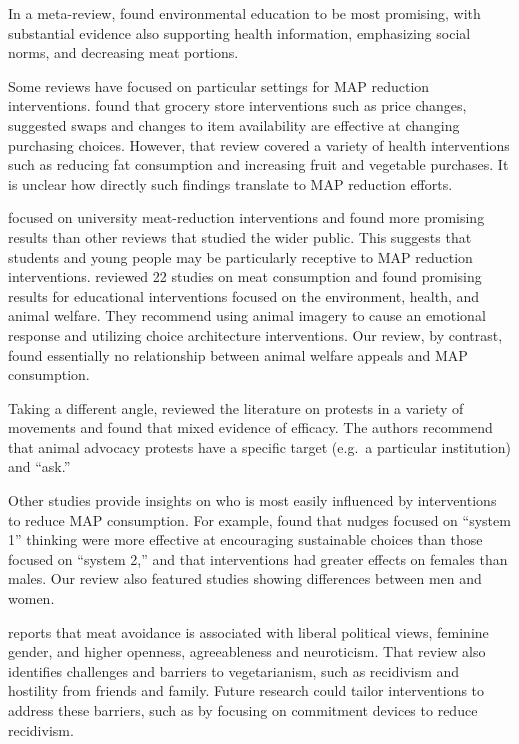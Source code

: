 \documentclass[sn-nature,referee,pdflatex]{sn-jnl}
\begin{document}
In a meta-review, \citep{grundy2022} found environmental education to be
most promising, with substantial evidence also supporting health
information, emphasizing social norms, and decreasing meat portions.

Some reviews have focused on particular settings for MAP reduction
interventions. \citep{hartmannboyce2018} found that grocery store
interventions such as price changes, suggested swaps and changes to item
availability are effective at changing purchasing choices. However, that
review covered a variety of health interventions such as reducing fat
consumption and increasing fruit and vegetable purchases. It is unclear
how directly such findings translate to MAP reduction efforts.

\citep{chang2023} focused on university meat-reduction interventions and
found more promising results than other reviews that studied the wider
public. This suggests that students and young people may be particularly
receptive to MAP reduction interventions. \citep{harguess2020} reviewed
22 studies on meat consumption and found promising results for
educational interventions focused on the environment, health, and animal
welfare. They recommend using animal imagery to cause an emotional
response and utilizing choice architecture interventions. Our review, by
contrast, found essentially no relationship between animal welfare
appeals and MAP consumption.

Taking a different angle, \citep{adleberg2018} reviewed the literature
on protests in a variety of movements and found that mixed evidence of
efficacy. The authors recommend that animal advocacy protests have a
specific target (e.g.~a particular institution) and ``ask.''

Other studies provide insights on who is most easily influenced by
interventions to reduce MAP consumption. For example,
\citep{blackford2021} found that nudges focused on ``system 1'' thinking
were more effective at encouraging sustainable choices than those
focused on ``system 2,'' and that interventions had greater effects on
females than males. Our review also featured studies showing differences
between men and women.

\citep{rosenfeld2018} reports that meat avoidance is associated with
liberal political views, feminine gender, and higher openness,
agreeableness and neuroticism. That review also identifies challenges
and barriers to vegetarianism, such as recidivism and hostility from
friends and family. Future research could tailor interventions to
address these barriers, such as by focusing on commitment devices to
reduce recidivism.
\end{document}
